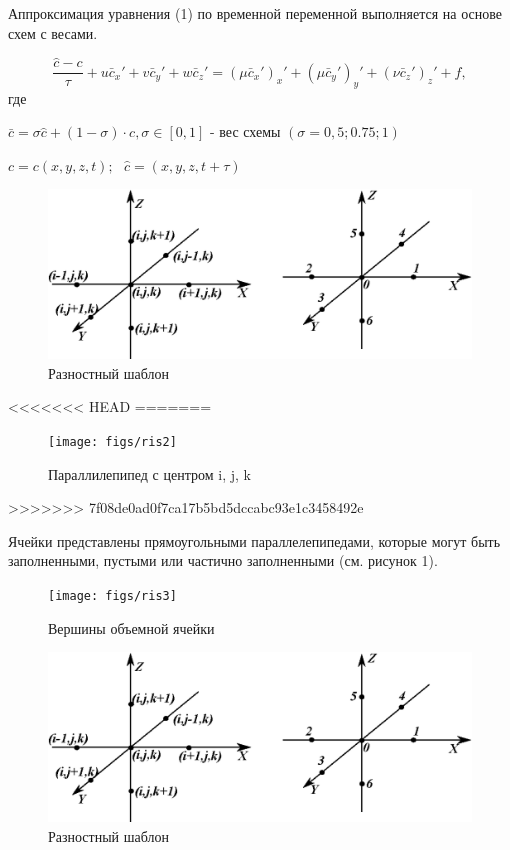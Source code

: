 \documentclass[12pt]{article}
\begin{document}
Аппроксимация уравнения (1) по временной переменной выполняется на основе схем с весами. 

\begin{equation}
	\frac{\hat c - c}{\tau} + u\bar{c}_x' + v\bar{c}_y' + w\bar{c}_z' = (\mu\bar{c}_x')_x' + (\mu\bar{c}_y')_y' + (\nu\bar{c}_z')_z' + f ,		
\end{equation}
где  

$\bar{c} = \sigma\hat c + (1 - \sigma)\cdot c , \sigma \in [0,1] $ - вес схемы $(\sigma = 0,5; 0.75; 1)$

$c=c(x, y, z, t);$ $ $ $\hat c = (x, y, z, t + \tau)  $


\begin{figure}[h!]
	\centering
	\includegraphics {figs/shablon}
	\caption{ Разностный шаблон}
\end{figure}

<<<<<<< HEAD
=======
\begin{figure}[h!]
	\centering
	\texttt{[image: figs/ris2]}
	\caption{ Параллилепипед с центром i, j, k}
\end{figure}
>>>>>>> 7f08de0ad0f7ca17b5bd5dccabc93e1c3458492e

Ячейки представлены прямоугольными параллелепипедами, которые могут быть заполненными, пустыми или частично заполненными (см. рисунок 1). 

\begin{figure}[h!]
	\centering
	\texttt{[image: figs/ris3]}
	\caption{ Вершины объемной ячейки}
\end{figure} 

\begin{figure}[h!]
	\centering
	\includegraphics {figs/shablon}
	\caption{ Разностный шаблон}
\end{figure}
\end{document}
